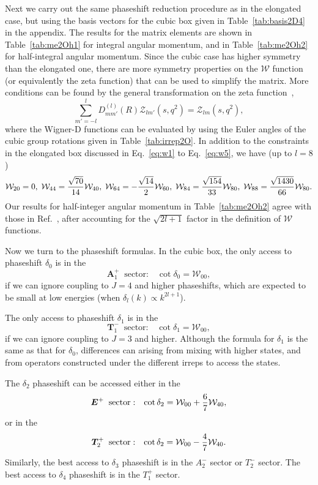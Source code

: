 \documentclass[aps,prd,reprint,showpacs,floatfix,longbibliography,,superscriptaddress]{revtex4-1}
\def\mw{\mathcal{W}}
\def\beq{\begin{equation}}
\def\eeq{\end{equation}}
\begin{document}
\begin{widetext}
Next we carry out the same phaseshift reduction procedure as in the elongated case,  
but using the basis vectors for the cubic box given in Table~\ref{tab:basis2D4} in the appendix.
The results for the matrix elements are shown in Table~\ref{tab:me2Oh1} for integral angular momentum,
and in Table~\ref{tab:me2Oh2} for half-integral angular momentum.
Since the cubic case has higher symmetry than the elongated one, there are more symmetry properties on the $\mw$ 
function (or equivalently the zeta function) that can be used to simplify the matrix.
More conditions can be found by the general transformation on the zeta function~\cite{Luscher:1990ux},
\beq
\sum_{m'=-l}^{l} D_{mm'}^{(l)}(R) \mathcal{Z}_{lm'}(s,q^2)= \mathcal{Z}_{lm}(s,q^2),
\eeq
where the Wigner-D functions can be evaluated by using the Euler angles of the cubic group rotations given in Table~\ref{tab:irrep2O}. 
In addition to the constraints in the elongated box discussed in Eq.~\ref{eq:w1} to Eq.~\ref{eq:w5}, 
we have (up to $l=8$)
%
\beq
\mw_{20} =0,\;
\mw_{44} = {\sqrt{70}\over 14}  \mw_{40},\;
\mw_{64} = - {\sqrt{14}\over 2}  \mw_{60}, \;
\mw_{84} =  {\sqrt{154}\over 33}  \mw_{80}, \;
\mw_{88} =  {\sqrt{1430}\over 66}  \mw_{80}.
\label{eq:wcubic}
\eeq
%
Our results for half-integer angular momentum in Table~\ref{tab:me2Oh2} agree with those
 in Ref.~\cite{Bernard:2008ax}, 
 after accounting for the $\sqrt{2l+1}$ factor in the definition of $\mw$ functions.

Now we turn to the phaseshift formulas. 
In the cubic box, the only access to  phaseshift  $\delta_0$  is in the 
\beq
{\bm A^+_1 \;\;\text{sector}:}  \;\;\;  \cot\delta_0 =  \mw_{00},
\eeq
if we can ignore coupling to $J=4$ and higher phaseshifts, which are expected to be small at low energies 
(when $\delta_l(k)\propto k^{2l+1}$).

The only access to phaseshift $\delta_1$  is in the 
\beq
{\bm T^-_1 \;\;\text{sector}:}  \;\;\;  \cot\delta_1 =  \mw_{00},
\eeq
if we can ignore coupling to $J=3$ and higher. 
Although the formula for $\delta_1$ is the same as that for $\delta_0$,
 differences can arising from mixing with higher states, 
and from operators constructed under the different irreps to access the states.

The  $\delta_2$ phaseshift can be accessed either in the
\beq
{\bm E^+ \;\;\text{sector}:}  \;\;\;  \cot\delta_2 =  \mw_{00}+{6\over 7} \mw_{40},
\eeq
or  in the
\beq
{\bm T^+_2 \;\;\text{sector}:}  \;\;\;  \cot\delta_2 =  \mw_{00}-{4\over 7} \mw_{40}.
\eeq
Similarly, the best access to  $\delta_3$ phaseshift is in the  $A^-_2$ sector or $T^-_2$ sector.
The best access to  $\delta_4$ phaseshift is in the $T^+_1$ sector.


\end{widetext}
\end{document}
